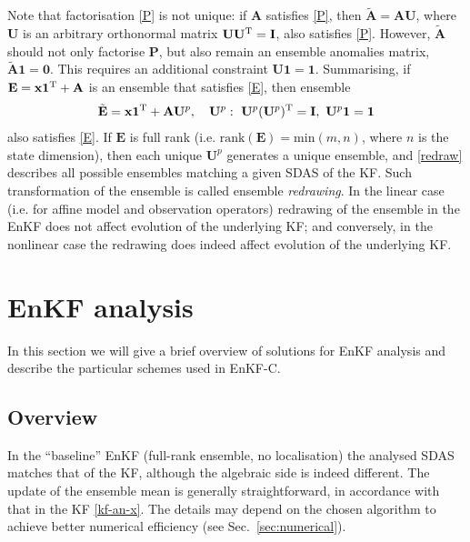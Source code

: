 \documentclass[11pt]{report}
\newcommand{\mb} {\mathbf}
\newcommand{\T}{^{\tiny \mathrm T}}
\begin{document}
Note that factorisation \eqref{P} is not unique: if $\mb A$ satisfies \eqref{P}, then $\tilde {\mb A} = \mb A \mb U$, where $\mb U$ is an arbitrary orthonormal matrix $\mb U \mb U\T = \mb I$, also satisfies \eqref{P}.
However, $\tilde{\mb A}$ should not only factorise $\mb P$, but also remain an ensemble anomalies matrix, $\tilde{\mb A} \mb 1 = \mb 0$.
This requires an additional constraint $\mb U \mb 1 = \mb 1$.
Summarising, if $\mb E = \mb x \mb 1\T + \mb A$ is an ensemble that satisfies \eqref{E}, then ensemble
\begin{align}
  \label{redraw}
  \tilde{\mb E} = \mb x \mb 1\T + \mb A \mb U^p, \quad \mb U^p:\ \mb U^p (\mb U^p)\T = \mb I,\ \mb U^p \mb 1 = \mb 1
\end{align}
also satisfies \eqref{E}. 
If $\mb E$ is full rank (i.e. $\mathrm{rank}(\mb E) = \mathrm{min}(m, n)$, where $n$ is the state dimension), then each unique $\mb U^p$ generates a unique ensemble, and \eqref{redraw} describes all possible ensembles matching a given SDAS of the KF.
Such transformation of the ensemble is called ensemble \emph{redrawing}.
In the linear case (i.e. for affine model and observation operators) redrawing of the ensemble in the EnKF does not affect evolution of the underlying KF; and conversely, in the nonlinear case the redrawing does indeed affect evolution of the underlying KF.

\section{EnKF analysis}

In this section we will give a brief overview of solutions for EnKF analysis and describe the particular schemes used in EnKF-C.

\subsection{Overview}
\label{sec:enkf-overview}

In the ``baseline'' EnKF (full-rank ensemble, no localisation) the analysed SDAS matches that of the KF, although the algebraic side is indeed different.
The update of the ensemble mean is generally straightforward, in accordance with that in the KF \eqref{kf-an-x}.
The details may depend on the chosen algorithm to achieve better numerical efficiency (see Sec.~\ref{sec:numerical}).
\end{document}
